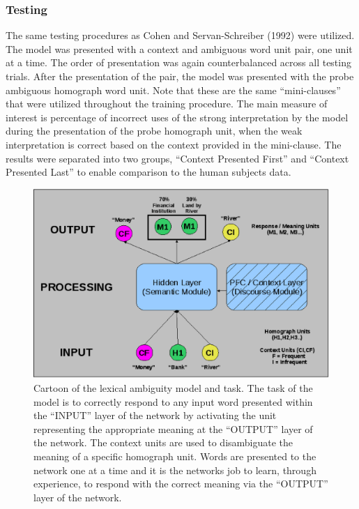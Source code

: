 \subsubsection{Testing}
The same testing procedures as Cohen and Servan-Schreiber (1992) were utilized.  The model was presented with a context and ambiguous word unit pair, one unit at a time.  The order of presentation was again counterbalanced across all testing trials.  After the presentation of the pair, the model was presented with the probe ambiguous homograph word unit.  Note that these are the same ``mini-clauses'' that were utilized throughout the training procedure. The main measure of interest is percentage of incorrect uses of the strong interpretation by the model during the presentation of the probe homograph unit, when the weak interpretation is correct based on the context provided in the mini-clause.  The results were separated into two groups, ``Context Presented First'' and ``Context Presented Last'' to enable comparison to the human subjects data.

\begin{figure}[tp]
\begin{center}
	\includegraphics[width=115mm]{figures/lexAmb_network_cartoon.eps}
\end{center}
\caption{Cartoon of the lexical ambiguity model and task.  The task of the model is to correctly respond to any input word presented within the ``INPUT'' layer of the network by activating the unit representing the appropriate meaning at the ``OUTPUT'' layer of the network.  The context units are used to disambiguate the meaning of a specific homograph unit.  Words are presented to the network one at a time and it is the networks job to learn, through experience, to respond with the correct meaning via the ``OUTPUT'' layer of the network.}

\label{lexamb-model-task}
\end{figure} 

